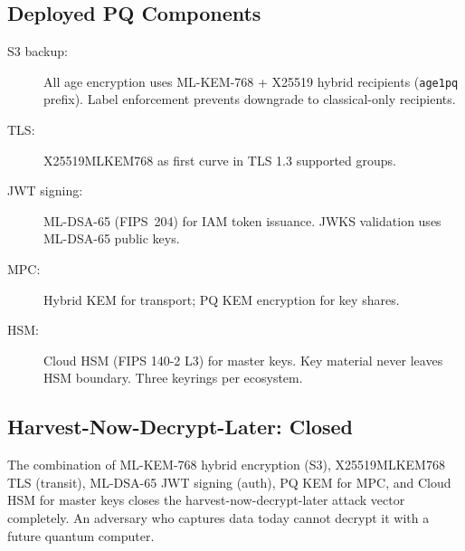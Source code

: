 \subsection{Deployed PQ Components}

\begin{description}
\item[S3 backup:] All age encryption uses ML-KEM-768 + X25519 hybrid
  recipients (\texttt{age1pq} prefix).  Label enforcement prevents
  downgrade to classical-only recipients.
\item[TLS:] X25519MLKEM768 as first curve in TLS 1.3 supported groups.
\item[JWT signing:] ML-DSA-65 (FIPS~204) for IAM token issuance.
  JWKS validation uses ML-DSA-65 public keys.
\item[MPC:] Hybrid KEM for transport; PQ KEM encryption for key shares.
\item[HSM:] Cloud HSM (FIPS 140-2 L3) for master keys.  Key material
  never leaves HSM boundary.  Three keyrings per ecosystem.
\end{description}

\subsection{Harvest-Now-Decrypt-Later: Closed}

The combination of ML-KEM-768 hybrid encryption (S3), X25519MLKEM768
TLS (transit), ML-DSA-65 JWT signing (auth), PQ KEM for MPC, and
Cloud HSM for master keys closes the harvest-now-decrypt-later attack
vector completely.  An adversary who captures data today cannot decrypt
it with a future quantum computer.

